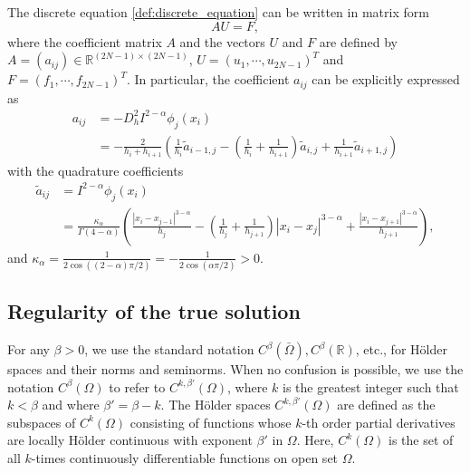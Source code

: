 \documentclass{amsart}
\theoremstyle{definition}
\theoremstyle{remark}
\numberwithin{equation}{section}
\begin{document}
The discrete equation \eqref{def:discrete_equation} can be written in matrix form
\begin{equation} \label{eq:equation_matrix}
  AU = F ,
\end{equation}
where the coefficient matrix $A$ and the vectors $U$ and $F$ are defined by
$A=(a_{ij}) \in \mathbb{R}^{(2N-1) \times (2N-1)}$, $U=(u_1, \cdots, u_{2N-1})^T$ and $F=(f_1, \cdots, f_{2N-1})^T$.
In particular, the coefficient \(a_{ij}\) can be explicitly expressed as
\begin{equation} \label{eq:aij}
  \begin{aligned}
    a_{ij} &= -  D_h^2 I^{2-\alpha} \phi_j(x_i) \\
    &= - \frac{2}{h_{i} + h_{i+1}}
    \left( \frac{1}{h_{i}} \tilde{a}_{i-1,j} - \left( \frac{1}{h_{i}} + \frac{1}{h_{i+1}} \right) \tilde{a}_{i,j} +  \frac{1}{h_{i+1}} \tilde{a}_{i+1, j} \right) 
  \end{aligned}
\end{equation}
with the quadrature coefficients
\begin{equation*} \label{eq:tildeaij}
  \begin{aligned}
    \tilde{a}_{ij} &= I^{2-\alpha} \phi_j(x_i) \\
    &= \frac{\kappa_\alpha}{\Gamma(4-\alpha)}
    \left( \frac{|x_{i}-x_{j-1}|^{3-\alpha}}{h_{j}} -\left( \frac{1}{h_{j}} + \frac{1}{h_{j+1}} \right)|x_i-x_{j}|^{3-\alpha} +  \frac{|x_{i}-x_{j+1}|^{3-\alpha}}{h_{j+1}} \right) ,
  \end{aligned}
\end{equation*}
and $\kappa_\alpha = \frac{1}{2\cos((2-\alpha)\pi/2)} = -\frac{1}{2\cos(\alpha\pi/2)} > 0 $.






\subsection{Regularity of the true solution}
\label{sec:regularity}


For any \(\beta > 0\), 
we use the standard notation \(C^\beta(\bar{\Omega}),  C^\beta(\mathbb{R})\), etc., for Hölder spaces
and their norms and seminorms.
When no confusion is possible, 
we use the notation \(C^\beta (\Omega)\) to refer to \(C^{k,\beta'} (\Omega)\), where \(k\) is the greatest integer such that \(k<\beta\) and where \(\beta' = \beta - k\).
The Hölder spaces \(C^{k, \beta'}(\Omega)\) are defined as the subspaces of \(C^k(\Omega)\) consisting of functions whose \(k\)-th order partial derivatives are locally Hölder continuous \cite[p.\,52]{MR473443} with exponent \(\beta'\) in \(\Omega\).
Here, \(C^k(\Omega)\) is the set of all \(k\)-times continuously differentiable functions on open set \(\Omega\).
\end{document}
